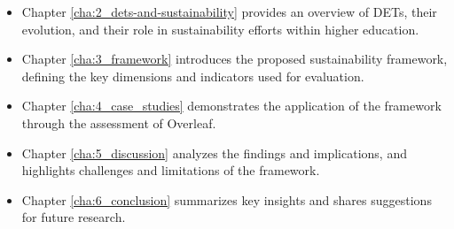 \begin{itemize}[noitemsep, topsep=4pt, parsep=0pt, partopsep=0pt]
\item Chapter \ref{cha:2_dets-and-sustainability} provides an overview of DETs, their evolution, and their role in sustainability efforts within higher education.
\item Chapter \ref{cha:3_framework} introduces the proposed sustainability framework, defining the key dimensions and indicators used for evaluation.
\item Chapter \ref{cha:4_case_studies} demonstrates the application of the framework through the assessment of Overleaf.
\item Chapter \ref{cha:5_discussion} analyzes the findings and implications, and highlights challenges and limitations of the framework.
\item Chapter \ref{cha:6_conclusion} summarizes key insights and shares suggestions for future research.
\end{itemize}